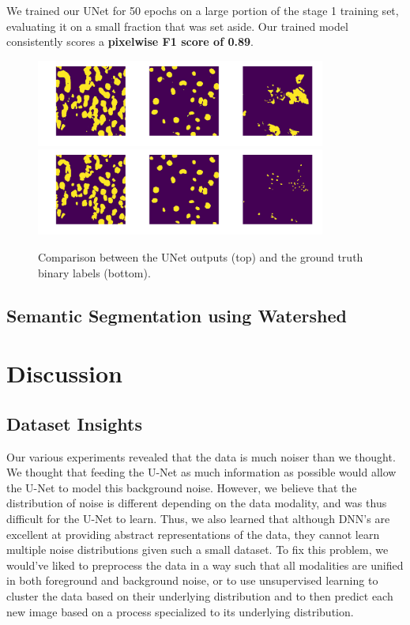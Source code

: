 \documentclass[paper=letter, fontsize=12pt]{article}
\numberwithin{equation}{section} %
\numberwithin{figure}{section} %
\numberwithin{table}{section} %
\begin{document}
We trained our UNet for 50 epochs on a large portion of the stage 1 training
set, evaluating it on a small fraction that was set aside.  Our trained model
consistently scores a \textbf{pixelwise F1 score of 0.89}.

\begin{figure}[H]
    \centering
    \includegraphics[width=0.85\textwidth]{./figs/unet-output.png}
    \includegraphics[width=0.85\textwidth]{./figs/ground-truth-binary.png}
    \caption{Comparison between the UNet outputs (top) and the ground truth
    binary labels (bottom).}
    \label{fig:unet-output}
\end{figure}

\subsection{Semantic Segmentation using Watershed}

\section{Discussion}

\subsection{ Dataset Insights }

Our various experiments revealed that the data is much noiser than we thought.
We thought that feeding the U-Net as much information as possible would allow
the U-Net to model this background noise. However, we believe that the
distribution of noise is different depending on the data modality, and was thus
difficult for the U-Net to learn. Thus, we also learned that although DNN's are
excellent at providing abstract representations of the data, they cannot learn
multiple noise distributions given such a small dataset. To fix this problem,
we would've liked to preprocess the data in a way such that all modalities are
unified in both foreground and background noise, or to use unsupervised
learning to cluster the data based on their underlying distribution and to then
predict each new image based on a process specialized to its underlying
distribution.
\end{document}
